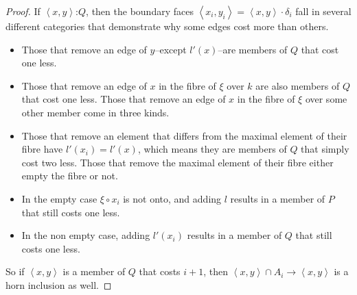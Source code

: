 \documentclass{tac}
\newcommand\of{\mathord:}
\newcommand\tuplet[1]{\left\langle{} #1 \right\rangle}
\begin{document}
\begin{proof}
  If \(\tuplet{x,y}\of Q\), then the boundary faces 
  \(\tuplet{x_i,y_i} = \tuplet{x,y}\cdot\delta_i\) fall in several different
  categories that demonstrate why some edges cost more than others. 
  \begin{itemize}
  \item Those that remove an edge of \(y\)--except \(l'(x)\)--are members of 
  \(Q\) 
  that cost one less. 
  \item Those that remove an edge of \(x\) in the fibre of \(\xi \) over \(k\) 
  are also 
  members of \(Q\) that cost one less. Those that remove an edge of \(x\) in 
  the fibre of \(\xi \) over some other member come in three kinds.
  \item Those that remove an element that differs from the maximal element of 
  their 
  fibre have \(l'(x_i) = l'(x)\), which means they are members of \(Q\) that 
  simply cost two less. 
  Those that remove the maximal element of their fibre either empty the fibre
  or not. 
  \item In the empty case \(\xi\circ x_i\) is not onto, and adding \(l\) results
  in a member of \(P\) that still costs one less.
  \item In the non empty case, adding \(l'(x_i)\) results in a member of \(Q\)
  that still costs one less.
  \end{itemize}
  So if \(\tuplet{x,y}\) is a member of \(Q\) that costs \(i+1\), then
  \(\tuplet{x,y}\cap A_i \to \tuplet{x,y}\) is a horn inclusion as well.
\end{proof}
\end{document}
